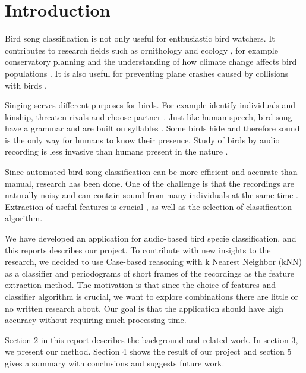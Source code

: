 \section{Introduction}
Bird song classification is not only useful for enthusiastic bird watchers. It contributes to research fields such as ornithology and ecology \cite{7418412}, for example conservatory planning  \cite{5360230} and the understanding of how climate change affects bird populations \cite{7418412}. It is also useful for preventing plane crashes caused by collisions with birds  \cite{5360230}.

Singing serves different purposes for birds. For example identify individuals and kinship, threaten rivals and choose partner  \cite{7073944}. Just like human speech, bird song have a grammar and are built on syllables \cite{5360230}. Some birds hide and therefore sound is the only way for humans to know their presence. Study of birds by audio recording is less invasive than humans present in the nature \cite{6123334}.

Since automated bird song classification can be more efficient and accurate than manual, research has been done. One of the challenge is that the recordings are naturally noisy and can contain sound from many individuals at the same time  \cite{7073944}. Extraction of useful features is crucial \cite{5360230}, as well as the selection of classification algorithm.

We have developed an application for audio-based bird specie classification, and this reports describes our project. To contribute with new insights to the research, we decided to use Case-based reasoning with k Nearest Neighbor (kNN) as a classifier and periodograms of short frames of the recordings as the feature extraction method. The motivation is that since the choice of features and classifier algorithm is crucial, we want to explore combinations there are little or no written research about. Our goal is that the application should have high accuracy without requiring much processing time.

Section 2 in this report describes the background and related work. In section 3, we present our method. Section 4 shows the result of our project and section 5 gives a summary with conclusions and suggests future work.
